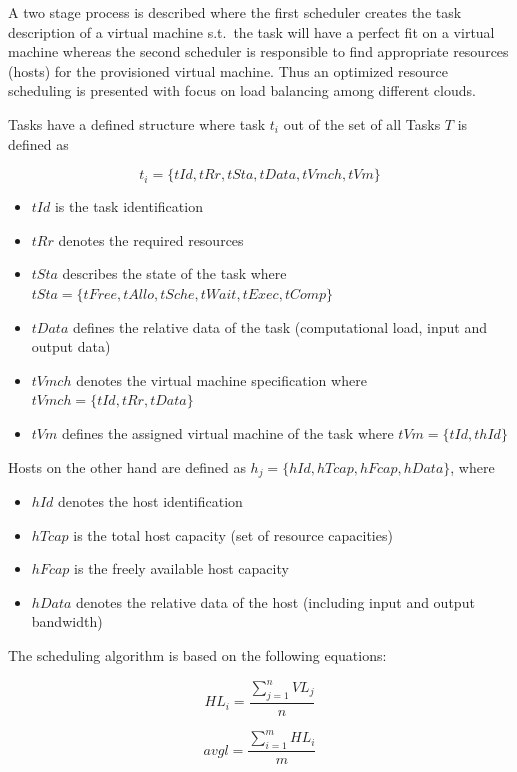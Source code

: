 A two stage process is described where the first scheduler creates the task description of a virtual machine s.t.~the task will have a perfect fit on a virtual machine whereas the second scheduler is responsible to find appropriate resources (hosts) for the provisioned virtual machine. Thus an optimized resource scheduling is presented with focus on load balancing among different clouds. 

Tasks have a defined structure where task $t_i$ out of the set of all Tasks $T$ is defined as 

\[t_i = \{tId, tRr, tSta, tData, tVmch, tVm\}\]

\begin{itemize}
	\item $tId$ is the task identification
	\item $tRr$ denotes the required resources
	\item $tSta$ describes the state of the task where $tSta = \{tFree,tAllo,tSche,tWait,tExec,tComp\}$
	\item $tData$ defines the relative data of the task (computational load, input and output data)
	\item $tVmch$ denotes the virtual machine specification where $tVmch = \{tId,tRr,tData\}$
	\item $tVm$ defines the assigned virtual machine of the task where $tVm = \{tId,thId\}$
\end{itemize}

Hosts on the other hand are defined as $h_j = \{hId, hTcap, hFcap, hData\}$, where

\begin{itemize}
	\item $hId$ denotes the host identification
	\item $hTcap$ is the total host capacity (set of resource capacities)
	\item $hFcap$ is the freely available host capacity
	\item $hData$ denotes the relative data of the host (including input and output bandwidth)
\end{itemize}


The scheduling algorithm is based on the following equations: 

\[ HL_i = \frac{\sum_{j=1}^{n}{VL_j}}{n} \]

\[ avgl = \frac{\sum_{i=1}^{m}{HL_i}}{m} \]

